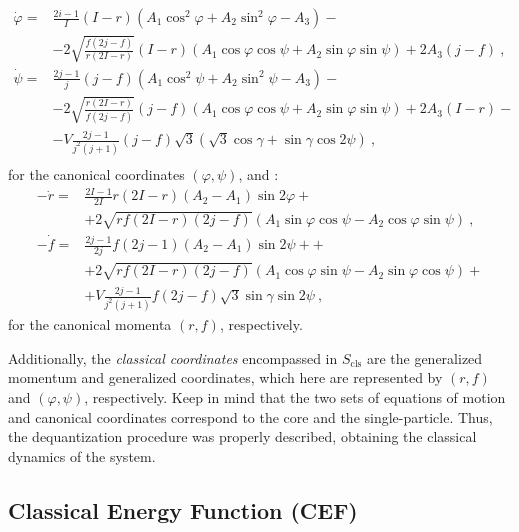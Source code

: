 \begin{align}
    \dot{\varphi}=&\frac{2i-1}{I}(I-r)\left(A_1\cos^2\varphi+A_2\sin^2\varphi-A_3\right)-\nonumber\\
                 &-2\sqrt{\frac{f(2j-f)}{r(2I-r)}}(I-r)\left(A_1\cos\varphi\cos\psi+A_2\sin\varphi\sin\psi\right)+2A_3(j-f)\ ,\nonumber\\
    \dot{\psi}=&\frac{2j-1}{j}(j-f)\left(A_1\cos^2\psi+A_2\sin^2\psi-A_3\right)-\nonumber\\
               &-2\sqrt{\frac{r(2I-r)}{f(2j-f)}}(j-f)\left(A_1\cos\varphi\cos\psi+A_2\sin\varphi\sin\psi\right)+2A_3(I-r)-\nonumber\\
               &-V\frac{2j-1}{j^2(j+1)}(j-f)\sqrt{3}\left(\sqrt{3}\cos\gamma+\sin\gamma\cos2\psi\right)\ , \nonumber\\
    \label{eq-of-motion-explicit-coordinates}
\end{align}
for the canonical coordinates $(\varphi,\psi)$, and \cite{raduta2020approach}:
\begin{align}
    -\dot{r}=&\frac{2I-1}{2I}r(2I-r)(A_2-A_1)\sin2\varphi+\nonumber\\
             &+2\sqrt{rf(2I-r)(2j-f)}\left(A_1\sin\varphi\cos\psi-A_2\cos\varphi\sin\psi\right)\ ,\nonumber\\
    -\dot{f}=&\frac{2j-1}{2j}f(2j-1)(A_2-A_1)\sin2\psi+\nonumber+\\
             &+2\sqrt{rf(2I-r)(2j-f)}\left(A_1\cos\varphi\sin\psi-A_2\sin\varphi\cos\psi\right)+\nonumber\\
             &+V\frac{2j-1}{j^2(j+1)}f(2j-f)\sqrt{3}\sin\gamma\sin2\psi\ ,
    \label{eq-of-motion-explicit-momenta}
\end{align}
for the canonical momenta $(r,f)$, respectively.

Additionally, the \emph{classical coordinates} encompassed in $S_\text{cls}$ are the generalized momentum and generalized coordinates, which here are represented by $(r,f)$ and $(\varphi,\psi)$, respectively. Keep in mind that the two sets of equations of motion and canonical coordinates correspond to the core and the single-particle. Thus, the dequantization procedure was properly described, obtaining the classical dynamics of the system. 

\subsection{Classical Energy Function (CEF)}

